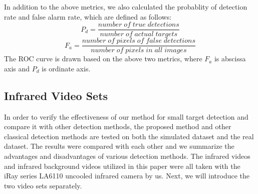\documentclass[journal]{IEEEtran}
\begin{document}
In addition to the above metrics, we also calculated the probablity of detection rate and false alarm rate, which are defined as follows:
\begin{equation}
  P_d=\frac{number\;of\;true\;detections}{number\;of\;actual\;targets}
\end{equation}
\begin{equation}
  F_a=\frac{number\;of\;pixels\;of\;false\;detections}{number\;of\;pixels\;in\;all\;images}
\end{equation}
The ROC curve is drawn based on the above two metrics, where $F_a$ is abscissa axis and $P_d$ is ordinate axis.


\subsection{Infrared Video Sets}
In order to verify the effectiveness of our method for small target detection and compare it with other detection methods, the proposed method and other classical detection methods are tested on both the simulated dataset and the real dataset. The results were compared with each other and we summarize the advantages and disadvantages of various detection methods. The infrared videos and infrared background videos utilized in this paper were all taken with the iRay series LA6110 uncooled infrared camera by us. Next, we will introduce the two video sets separately.
\end{document}
